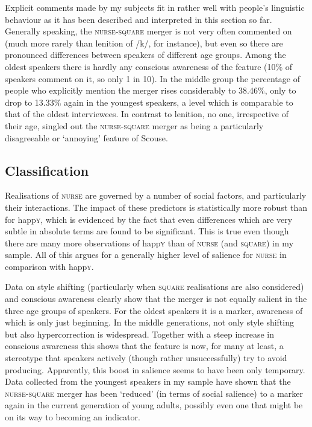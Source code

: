 Explicit comments made by my subjects fit in rather well with people's linguistic behaviour as it has been described and interpreted in this section so far.
Generally speaking, the \textsc{nurse}-\textsc{square} merger is not very often commented on (much more rarely than lenition of /k/, for instance), but even so there are pronounced differences between speakers of different age groups.
Among the oldest speakers there is hardly any conscious awareness of the feature (10\% of speakers comment on it, so only 1 in 10).
In the middle group the percentage of people who explicitly mention the merger rises considerably to 38.46\%, only to drop to 13.33\% again in the youngest speakers, a level which is comparable to that of the oldest interviewees.
In contrast to lenition, no one, irrespective of their age, singled out the \textsc{nurse}-\textsc{square} merger as being a particularly disagreeable or `annoying' feature of Scouse.

\subsection{Classification}

Realisations of \textsc{nurse} are governed by a number of social factors, and particularly their interactions.
The impact of these predictors is statistically more robust than for happ\textsc{y}, which is evidenced by the fact that even differences which are very subtle in absolute terms are found to be significant.
This is true even though there are many more observations of happ\textsc{y} than of \textsc{nurse} (and \textsc{square}) in my sample.
All of this argues for a generally higher level of salience for \textsc{nurse} in comparison with happ\textsc{y}.

Data on style shifting (particularly when \textsc{square} realisations are also considered) and conscious awareness clearly show that the merger is not equally salient in the three age groups of speakers.
For the oldest speakers it is a marker, awareness of which is only just beginning.
In the middle generations, not only style shifting but also hypercorrection is widespread.
Together with a steep increase in conscious awareness this shows that the feature is now, for many at least, a stereotype that speakers actively (though rather unsuccessfully) try to avoid producing.
Apparently, this boost in salience seems to have been only temporary.
Data collected from the youngest speakers in my sample have shown that the \textsc{nurse}-\textsc{square} merger has been `reduced' (in terms of social salience) to a marker again in the current generation of young adults, possibly even one that might be on its way to becoming an indicator.

